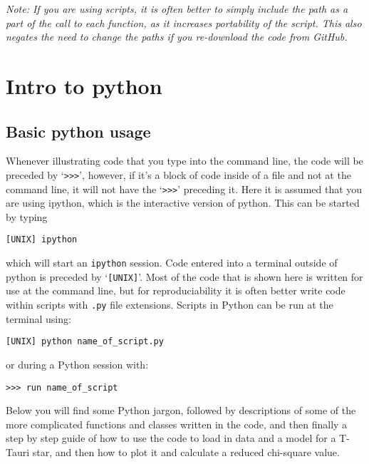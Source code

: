 \documentclass{article}
\begin{document}
\noindent \textit{Note: If you are using scripts, it is often better to simply include the path as a part of the call to each function, as it increases portability of the script. This also negates the need to change the paths if you re-download the code from GitHub.}

\section{Intro to python} \label{introtopython}
\subsection{Basic python usage} 

\noindent Whenever illustrating code that you type into the command line, the code will be preceded by `\texttt{>>>}', however, if it’s a block of code inside of a file and not at the command line, it will not have the `\texttt{>>>}' preceding it. Here it is assumed that you are using ipython, which is the interactive version of python. This can be started by typing

\vspace{2mm}
\texttt{[UNIX] ipython}
\vspace{2mm}

\noindent which will start an \texttt{ipython} session. Code entered into a terminal outside of python is preceded by `\texttt{[UNIX]}'. Most of the code that is shown here is written for use at the command line, but for reproduciability it is often better write code within scripts with \texttt{.py} file extensions. Scripts in Python can be run at the terminal using:

\vspace{2mm}
\texttt{[UNIX] python name\_of\_script.py}
\vspace{2mm}

\noindent or during a Python session with:

\vspace{2mm}
\texttt{>>> run name\_of\_script}
\vspace{2mm}

\noindent Below you will find some Python jargon, followed by descriptions of some of the more complicated functions and classes written in the code, and then finally a step by step guide of how to use the code to load in data and a model for a T-Tauri star, and then how to plot it and calculate a reduced chi-square value.

\vspace{2mm}
\end{document}
